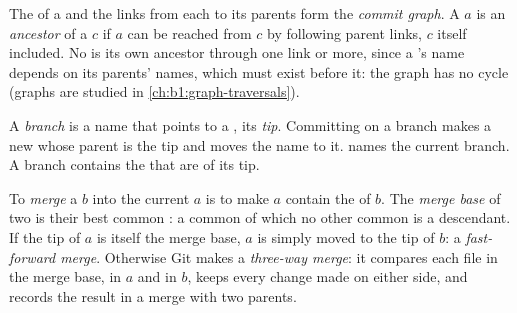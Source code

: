 \begin{definition}\label{def:b1:version-control:commit-graph}
The  of a  and the links from each  to its parents form the \emph{commit
graph}. A  $a$ is an \emph{ancestor} of a  $c$ if $a$ can
be reached from $c$ by following parent links, $c$ itself included. No  is its own ancestor through one link or
more, since a 's name depends on its parents' names, which must exist before it: the graph has no cycle (graphs
are studied in \cref{ch:b1:graph-traversals}).
\end{definition}

\begin{definition}[Branch]\label{def:b1:version-control:branch}
A \emph{branch} is a name that points to a , its \emph{tip}. Committing on a branch makes a new
 whose parent is the tip and moves the name to it.  names the current branch. A branch contains
the  that are  of its tip.
\end{definition}

\begin{definition}\label{def:b1:version-control:merge}
To \emph{merge} a  $b$ into the current  $a$ is to make $a$ contain the  of $b$. The \emph{merge
base} of two  is their best common : a common  of which no other common
 is a descendant. If the tip of $a$ is itself the merge base, $a$ is simply moved to the tip of $b$: a
\emph{fast-forward merge}. Otherwise Git makes a \emph{three-way merge}: it compares each file in the merge base, in $a$ and in $b$, keeps every change made on either side, and records
the result in a merge  with two parents.
\end{definition}

